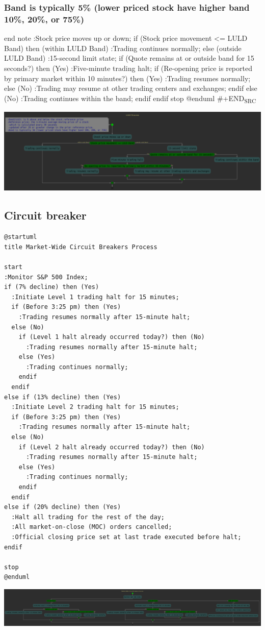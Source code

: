 \documentclass[11pt]{article}
\begin{document}
\subsubsection{Band is typically 5\% (lower priced stock have higher band 10\%, 20\%, or 75\%)}
\label{sec:org7258bc5}
end note
:Stock price moves up or down;
if (Stock price movement <= LULD Band) then (within LULD Band)
  :Trading continues normally;
else (outside LULD Band)
  :15-second limit state;
  if (Quote remains at or outside band for 15 seconds?) then (Yes)
    :Five-minute trading halt;
    if (Re-opening price is reported by primary market within 10 minutes?) then (Yes)
      :Trading resumes normally;
    else (No)
      :Trading may resume at other trading centers and exchanges;
    endif
  else (No)
    :Trading continues within the band;
  endif
endif
stop
@enduml
\#+END\textsubscript{SRC}
\begin{center}
\includegraphics[width=.9\linewidth]{./LULD.png}
\end{center}


\subsection{Circuit breaker}
\label{sec:org8e0e5f5}
\begin{verbatim}
@startuml
title Market-Wide Circuit Breakers Process

start
:Monitor S&P 500 Index;
if (7% decline) then (Yes)
  :Initiate Level 1 trading halt for 15 minutes;
  if (Before 3:25 pm) then (Yes)
    :Trading resumes normally after 15-minute halt;
  else (No)
    if (Level 1 halt already occurred today?) then (No)
      :Trading resumes normally after 15-minute halt;
    else (Yes)
      :Trading continues normally;
    endif
  endif
else if (13% decline) then (Yes)
  :Initiate Level 2 trading halt for 15 minutes;
  if (Before 3:25 pm) then (Yes)
    :Trading resumes normally after 15-minute halt;
  else (No)
    if (Level 2 halt already occurred today?) then (No)
      :Trading resumes normally after 15-minute halt;
    else (Yes)
      :Trading continues normally;
    endif
  endif
else if (20% decline) then (Yes)
  :Halt all trading for the rest of the day;
  :All market-on-close (MOC) orders cancelled;
  :Official closing price set at last trade executed before halt;
endif

stop
@enduml
\end{verbatim}
\begin{center}
\includegraphics[width=.9\linewidth]{./CircuitBreaker.png}
\end{center}
\end{document}
